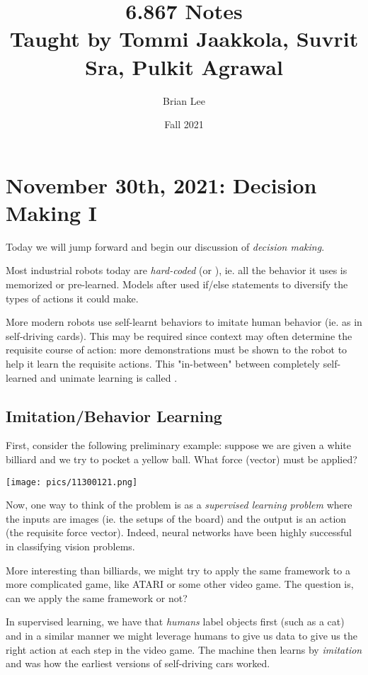 \documentclass[11pt]{scrartcl}
\title{\Large 6.867 Notes\\ 
\large Taught by Tommi Jaakkola, Suvrit Sra, Pulkit Agrawal}
\subtitle{}
\author{\small Brian Lee}
\date{\small Fall 2021}
\begin{document}
\section{November 30th, 2021: Decision Making I}

Today we will jump forward and begin our discussion of \textit{decision making}.

Most industrial robots today are \textit{hard-coded} (or ), ie. all the behavior it uses is memorized or pre-learned. Models after used if/else statements to diversify the types of actions it could make. 

More modern robots use self-learnt behaviors to imitate human behavior (ie. as in self-driving cards). This may be required since context may often determine the requisite course of action: more demonstrations must be shown to the robot to help it learn the requisite actions. This "in-between" between completely self-learned and unimate learning is called . 

\subsection{Imitation/Behavior Learning}

First, consider the following preliminary example: suppose we are given a white billiard and we try to pocket a yellow ball. What force (vector) must be applied? 

\begin{center}
\texttt{[image: pics/11300121.png]}
\end{center}
Now, one way to think of the problem is as a \textit{supervised learning problem} where the inputs are images (ie. the setups of the board) and the output is an action (the requisite force vector). Indeed, neural networks have been highly successful in classifying vision problems. 

More interesting than billiards, we might try to apply the same framework to a more complicated game, like ATARI or some other video game. The question is, can we apply the same framework or not? 

In supervised learning, we have that \textit{humans} label objects first (such as a cat) and in a similar manner we might leverage humans to give us data to give us the right action at each step in the video game. The machine then learns by \textit{imitation} and was how the earliest versions of self-driving cars worked. 
\end{document}
